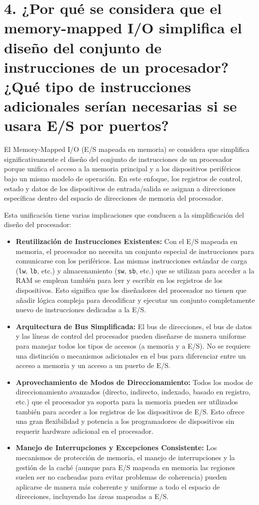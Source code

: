 \documentclass[12pt, a4paper]{article}
\begin{document}
\section*{4. ¿Por qué se considera que el memory-mapped I/O simplifica el diseño del conjunto de instrucciones de un procesador? ¿Qué tipo de instrucciones adicionales serían necesarias si se usara E/S por puertos?}
El Memory-Mapped I/O (E/S mapeada en memoria) se considera que simplifica significativamente el diseño del conjunto de instrucciones de un procesador porque unifica el acceso a la memoria principal y a los dispositivos periféricos bajo un mismo modelo de operación. En este enfoque, los registros de control, estado y datos de los dispositivos de entrada/salida se asignan a direcciones específicas dentro del espacio de direcciones de memoria del procesador.

Esta unificación tiene varias implicaciones que conducen a la simplificación del diseño del procesador:
\begin{itemize}
    \item \textbf{Reutilización de Instrucciones Existentes:} Con el E/S mapeada en memoria, el procesador no necesita un conjunto especial de instrucciones para comunicarse con los periféricos. Las mismas instrucciones estándar de carga (\texttt{lw}, \texttt{lb}, etc.) y almacenamiento (\texttt{sw}, \texttt{sb}, etc.) que se utilizan para acceder a la RAM se emplean también para leer y escribir en los registros de los dispositivos. Esto significa que los diseñadores del procesador no tienen que añadir lógica compleja para decodificar y ejecutar un conjunto completamente nuevo de instrucciones dedicadas a la E/S.
    \item \textbf{Arquitectura de Bus Simplificada:} El bus de direcciones, el bus de datos y las líneas de control del procesador pueden diseñarse de manera uniforme para manejar todos los tipos de accesos (a memoria y a E/S). No se requiere una distinción o mecanismos adicionales en el bus para diferenciar entre un acceso a memoria y un acceso a un puerto de E/S.
    \item \textbf{Aprovechamiento de Modos de Direccionamiento:} Todos los modos de direccionamiento avanzados (directo, indirecto, indexado, basado en registro, etc.) que el procesador ya soporta para la memoria pueden ser utilizados también para acceder a los registros de los dispositivos de E/S. Esto ofrece una gran flexibilidad y potencia a los programadores de dispositivos sin requerir hardware adicional en el procesador.
    \item \textbf{Manejo de Interrupciones y Excepciones Consistente:} Los mecanismos de protección de memoria, el manejo de interrupciones y la gestión de la caché (aunque para E/S mapeada en memoria las regiones suelen ser no cacheadas para evitar problemas de coherencia) pueden aplicarse de manera más coherente y uniforme a todo el espacio de direcciones, incluyendo las áreas mapeadas a E/S.
\end{itemize}
\end{document}
